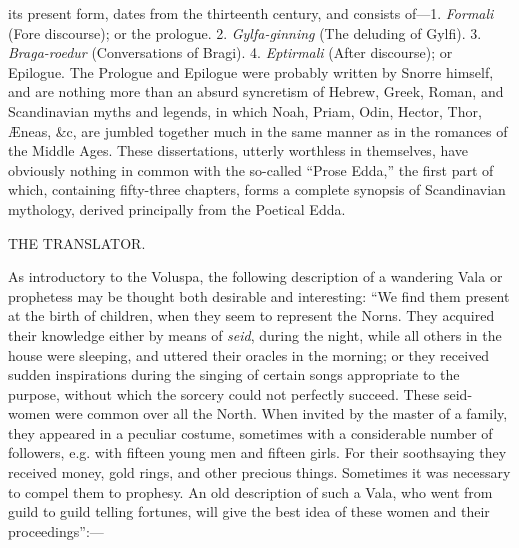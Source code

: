 its present form, dates from the thirteenth century, and consists
of—1. \emph{Formali} (Fore discourse); or the prologue. 2. \emph{Gylfa-ginning}
(The deluding of Gylfi). 3. \emph{Braga-roedur} (Conversations of Bragi).
4. \emph{Eptirmali} (After discourse); or Epilogue. The Prologue and
Epilogue were probably written by Snorre himself, and are nothing more
than an absurd syncretism of Hebrew, Greek, Roman, and Scandinavian
myths and legends, in which Noah, Priam, Odin, Hector, Thor, Æneas,
\&c, are jumbled together much in the same manner as in the romances of
the Middle Ages. These dissertations, utterly worthless in themselves,
have obviously nothing in common with the so-called ``Prose Edda,'' the
first part of which, containing fifty-three chapters, forms a complete
synopsis of Scandinavian mythology, derived principally from the
Poetical Edda.

THE TRANSLATOR.


As introductory to the Voluspa, the following description of a
wandering Vala or prophetess may be thought both desirable and
interesting: ``We find them present at the birth of children, when they
seem to represent the Norns. They acquired their knowledge either by
means of \emph{seid}, during the night, while all others in the house were
sleeping, and uttered their oracles in the morning; or they received
sudden inspirations during the singing of certain songs appropriate to
the purpose, without which the sorcery could not perfectly succeed.
These seid-women were common over all the North. When invited by the
master of a family, they appeared in a peculiar costume, sometimes
with a considerable number of followers, e.g. with fifteen young men
and fifteen girls. For their soothsaying they received money, gold
rings, and other precious things. Sometimes it was necessary to compel
them to prophesy. An old description of such a Vala, who went from
guild to guild telling fortunes, will give the best idea of these
women and their proceedings'':—


